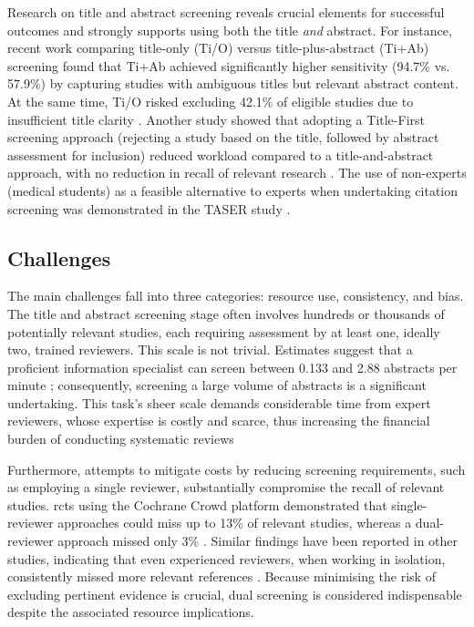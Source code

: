 \documentclass{article}
\begin{document}
Research on title and abstract screening reveals crucial elements for successful outcomes and strongly supports using both the title \emph{and} abstract. For instance, recent work comparing title-only (Ti/O) versus title-plus-abstract (Ti+Ab) screening found that Ti+Ab achieved significantly higher sensitivity (94.7\% vs. 57.9\%) by capturing studies with ambiguous titles but relevant abstract content. At the same time, Ti/O risked excluding 42.1\% of eligible studies due to insufficient title clarity \cite{teo_title-plus-abstract_2023}. Another study showed that adopting a Title-First screening approach (rejecting a study based on the title, followed by abstract assessment for inclusion) reduced workload compared to a title-and-abstract approach, with no reduction in recall of relevant research \cite{mateen_titles_2013}. The use of non-experts (medical students) as a feasible alternative to experts when undertaking citation screening was demonstrated in the TASER study \cite{ng_title_2014}.


\subsection{Challenges}

The main challenges fall into three categories: resource use, consistency, and bias. The title and abstract screening stage often involves hundreds or thousands of potentially relevant studies, each requiring assessment by at least one, ideally two, trained reviewers. This scale is not trivial. Estimates suggest that a proficient information specialist can screen between 0.133 and 2.88 abstracts per minute \cite{shemilt_use_2016,giummarra_evaluation_2020,felizardo_visual_2013}; consequently, screening a large volume of abstracts is a significant undertaking. This task's sheer scale demands considerable time from expert reviewers, whose expertise is costly and scarce, thus increasing the financial burden of conducting systematic reviews

Furthermore, attempts to mitigate costs by reducing screening requirements, such as employing a single reviewer, substantially compromise the recall of relevant studies. \gls*{rcts} using the Cochrane Crowd platform demonstrated that single-reviewer approaches could miss up to 13\% of relevant studies, whereas a dual-reviewer approach missed only 3\% \cite{gartlehner_single-reviewer_2020}. Similar findings have been reported in other studies, indicating that even experienced reviewers, when working in isolation, consistently missed more relevant references \cite{waffenschmidt_single_2019}. Because minimising the risk of excluding pertinent evidence is crucial, dual screening is considered indispensable despite the associated resource implications.
\end{document}

